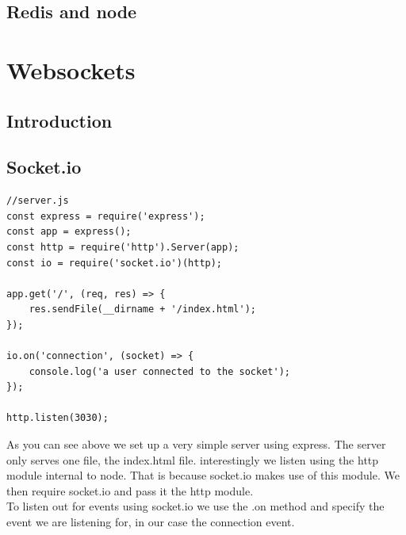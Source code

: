 \documentclass[a4paper]{article}
\begin{document}
\subsection{Redis and node}

\section{Websockets}
\subsection{Introduction}
\subsection{Socket.io}
\begin{lstlisting}
//server.js
const express = require('express');
const app = express();
const http = require('http').Server(app);
const io = require('socket.io')(http);

app.get('/', (req, res) => {
    res.sendFile(__dirname + '/index.html');
});

io.on('connection', (socket) => {
    console.log('a user connected to the socket');
});

http.listen(3030);
\end{lstlisting}
As you can see above we set up a very simple server using express. The server only serves one file, the index.html file. interestingly we listen using the http module internal to node. That is because socket.io makes use of this module. We then require socket.io and pass it the http module.\\

To listen out for events using socket.io we use the .on method and specify the event we are listening for, in our case the connection event.\\
\end{document}
